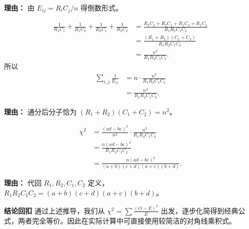 \begin{proofbox}
\begin{description}[style=nextline, leftmargin=2.8em, labelsep=0.5em, itemsep=0.55em]
\[			\]
			\par\textbf{理由：} 由 $E_{ij}=R_iC_j/n$ 得倒数形式。
		\item[\textbf{步骤五（通分合并）：}]
			\[
				\begin{aligned}
					\frac{1}{R_1C_1}+\frac{1}{R_1C_2}+\frac{1}{R_2C_1}+\frac{1}{R_2C_2} &= \frac{R_2C_2+R_2C_1+R_1C_2+R_1C_1}{R_1R_2C_1C_2} \\ &= \frac{(R_1+R_2)(C_1+C_2)}{R_1R_2C_1C_2} \\ &= \frac{n^2}{R_1R_2C_1C_2}.
			\end{aligned}
			\]
			所以
			\[
				\begin{aligned}
					\sum_{i,j}\frac{1}{E_{ij}} &= n\cdot\frac{n^2}{R_1R_2C_1C_2} \\ &= \frac{n^3}{R_1R_2C_1C_2}.
			\end{aligned}
			\]
			\par\textbf{理由：} 通分后分子恰为 $(R_1+R_2)(C_1+C_2)=n^2$。
		\item[\textbf{步骤六（代入得简洁公式）：}]
			\[
				\begin{aligned}
					\chi^2 &= \frac{(ad-bc)^2}{n^2}\cdot\frac{n^3}{R_1R_2C_1C_2} \\ &= \frac{n(ad-bc)^2}{R_1R_2C_1C_2} \\ &= \frac{n(ad-bc)^2}{(a+b)(c+d)(a+c)(b+d)}.
			\end{aligned}
			\]
			\par\textbf{理由：} 代回 $R_1,R_2,C_1,C_2$ 定义，$R_1R_2C_1C_2 = (a+b)(c+d)(a+c)(b+d)$。
	\end{description}

	\medskip
	\textbf{\textcolor{CProof}{结论回扣}}
	通过上述推导，我们从 $\chi^2=\sum\frac{(O-E)^2}{E}$ 出发，逐步化简得到经典公式，两者完全等价。因此在实际计算中可直接使用较简洁的对角线乘积式。
\end{proofbox}
